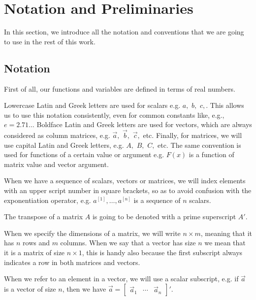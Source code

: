 \documentclass[pdflatex,sn-mathphys-num]{sn-jnl}%
\theoremstyle{thmstyleone}%
\theoremstyle{thmstyletwo}%
\theoremstyle{thmstylethree}%
\begin{document}
\section{Notation and Preliminaries}\label{background}

In this section, we introduce all the notation and conventions that we are going
to use in the rest of this work.

\subsection{Notation}

First of all, our functions and variables are defined in terms of
real numbers.

Lowercase Latin and Greek letters are used for scalars e.g. \(a,\) \(b,\)
\(c,\). This allows us to use this notation consistently, even for common
constants like, e.g., \(e = 2.71\ldots\)  Boldface Latin and Greek letters are
used for vectors, which are always considered as column matrices, e.g. \(\vec
a,\) \(\vec b,\) \(\vec c,\) etc. Finally, for matrices, we will use capital
Latin and Greek letters, e.g. \(A,\) \(B,\) \(C,\) etc.  The same convention is
used for functions of a certain value or argument e.g. \(F(x)\) is a function of
matrix value and vector argument.

When we have a sequence of scalars, vectors or matrices, we will index elements
with an upper script number in square brackets, so as to avoid confusion with
the exponentiation operator, e.g. \(a^{[1]},\ldots,a^{[n]}\) is a sequence of
\(n\) scalars.

The transpose of a matrix \(A\) is going to be denoted with a prime superscript
\(A'\).

When we specify the dimensions of a matrix, we will write \(n \times m\),
meaning that it has \(n\) rows and \(m\) columns.  When we say that a vector has
size \(n\) we mean that it is a matrix of size \(n \times 1\), this is handy
also because the first subscript always indicates a row in both matrices and
vectors.

When we refer to an element in a vector, we will use a scalar subscript, e.g. if
\(\vec a\) is a vector of size \(n\), then we have \(\vec a =
[\begin{array}{ccc} \vec a_1 & \cdots & \vec a_n \end{array}]'.\)
\end{document}
